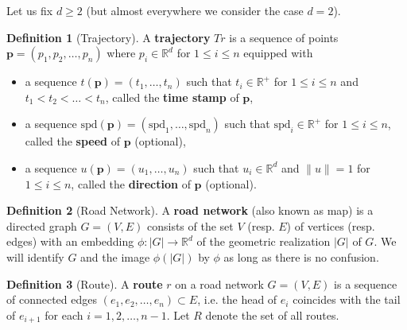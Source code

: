 \documentclass{article}
\numberwithin{equation}{section}
\theoremstyle{definition}
\newtheorem{definition}{Definition}[section]
\begin{document}
Let us fix $d \geq 2$ (but almost everywhere we consider the case $d = 2$).
\begin{definition}[Trajectory] \label{Tr}
A \textbf{trajectory} $Tr$ is a sequence of points $\mathbf{p} = (p_1,p_2,\dots, p_n)$ where $p_i\in \mathbb{R}^d$ for $1\leq i\leq n$ equipped with 
\begin{itemize}
    \item a sequence $t(\mathbf{p}) = (t_1,\dots,t_{n})$ such that $t_i\in \mathbb{R}^{+}$ for $1\leq i\leq n$ and  $t_1<t_2<\dots <t_n$, called the \textbf{time stamp} of $\mathbf{p}$,
    \item a sequence $\text{spd}(\mathbf{p}) = (\text{spd}_1,\dots,\text{spd}_{n})$ such that  $\text{spd}_i\in \mathbb{R}^{+}$  for $1\leq i\leq n$, called the \textbf{speed} of $\mathbf{p}$ (optional),
    \item a sequence $u(\mathbf{p}) = (u_1, \dots, u_n)$ such that $u_i\in \mathbb{R}^d$ and $\|u\|=1$ for $1\leq i\leq n$, called the \textbf{direction} of $\mathbf{p}$ (optional).
\end{itemize}
\end{definition}



\begin{definition}[Road Network] \label{RN}
A  \textbf{road network} (also known as map) is a directed graph $G=(V,E)$ consists of the set $V$ (resp. $E$) of vertices (resp. edges) with an embedding $\phi:|G|\rightarrow\mathbb{R}^{d}$ of the geometric realization $|G|$ of $G$.
We will identify $G$ and the image $\phi(|G|)$ by $\phi$ as long as there is no confusion.
\end{definition}



\begin{definition}[Route]
A \textbf{route} $r$ on a road network $G=(V,E)$ is a sequence of connected edges $(e_1,e_2,\dots,e_n)\subset E$, i.e. 
the head of $e_i$ coincides with the tail of $e_{i+1}$ for each $i = 1, 2, \dots, n-1$.
Let $R$ denote the set of all routes.
\end{definition}
\end{document}
